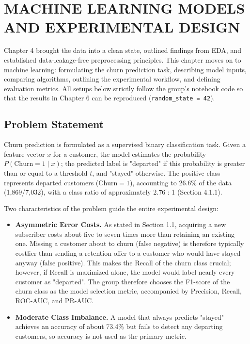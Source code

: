 
\section{MACHINE LEARNING MODELS AND EXPERIMENTAL DESIGN}
Chapter 4 brought the data into a clean state, outlined findings from EDA, and established data-leakage-free preprocessing principles. This chapter moves on to machine learning: formulating the churn prediction task, describing model inputs, comparing algorithms, outlining the experimental workflow, and defining evaluation metrics. All setups below strictly follow the group's notebook code so that the results in Chapter 6 can be reproduced (\texttt{random\_state = 42}).

\subsection{Problem Statement}

Churn prediction is formulated as a supervised binary classification task. Given a feature vector $x$ for a customer, the model estimates the probability $P(\text{Churn} = 1 \mid x)$; the predicted label is "departed" if this probability is greater than or equal to a threshold $t$, and "stayed" otherwise. The positive class represents departed customers ($\text{Churn} = 1$), accounting to 26.6\% of the data (1,869/7,032), with a class ratio of approximately 2.76 : 1 (Section 4.1.1).

Two characteristics of the problem guide the entire experimental design:

\begin{itemize}
    \item \textbf{Asymmetric Error Costs.} As stated in Section 1.1, acquiring a new subscriber costs about five to seven times more than retaining an existing one. Missing a customer about to churn (false negative) is therefore typically costlier than sending a retention offer to a customer who would have stayed anyway (false positive). This makes the Recall of the churn class crucial; however, if Recall is maximized alone, the model would label nearly every customer as "departed". The group therefore chooses the F1-score of the churn class as the model selection metric, accompanied by Precision, Recall, ROC-AUC, and PR-AUC.
    \item \textbf{Moderate Class Imbalance.} A model that always predicts "stayed" achieves an accuracy of about 73.4\% but fails to detect any departing customers, so accuracy is not used as the primary metric.
\end{itemize}

